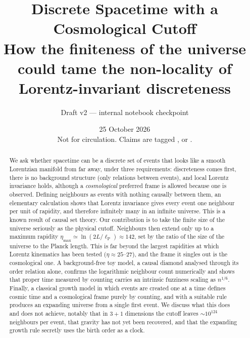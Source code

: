 \documentclass[11pt,a4paper]{article}
\title{Discrete Spacetime with a Cosmological Cutoff\\[4pt]
\large How the finiteness of the universe could tame the non-locality of Lorentz-invariant discreteness}
\author{Draft v2 --- internal notebook checkpoint}
\date{25 October 2026\\[2pt]\small Not for circulation. Claims are tagged \est, \lit{} or \ours.}
\newcommand{\lP}{\ell_{\mathrm P}}
\begin{document}
\maketitle

\begin{abstract}
We ask whether spacetime can be a discrete set of events that looks like a smooth Lorentzian manifold from far away, under three requirements: discreteness comes first, there is no background structure (only relations between events), and local Lorentz invariance holds, although a \emph{cosmological} preferred frame is allowed because one is observed. Defining neighbours as events with nothing causally between them, an elementary calculation shows that Lorentz invariance gives every event one neighbour per unit of rapidity, and therefore infinitely many in an infinite universe. This is a known result of causal set theory. Our contribution is to take the finite size of the universe seriously as the physical cutoff. Neighbours then extend only up to a maximum rapidity $\eta_{\max}\simeq\ln(2L/\lP)\approx142$, set by the ratio of the size of the universe to the Planck length. This is far beyond the largest rapidities at which Lorentz kinematics has been tested ($\eta\approx25$--$27$), and the frame it singles out is the cosmological one. A background-free toy model, a causal diamond analysed through its order relation alone, confirms the logarithmic neighbour count numerically and shows that proper time measured by counting carries an intrinsic fuzziness scaling as $n^{1/6}$. Finally, a classical growth model in which events are created one at a time defines cosmic time and a cosmological frame purely by counting, and with a suitable rule produces an expanding universe from a single first event. We discuss what this does and does not achieve, notably that in $3+1$ dimensions the cutoff leaves $\sim10^{124}$ neighbours per event, that gravity has not yet been recovered, and that the expanding growth rule secretly uses the birth order as a clock.
\end{abstract}
\end{document}
